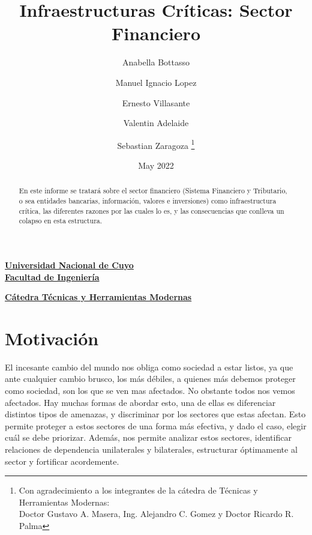 \documentclass{article}
\title{Infraestructuras Críticas: Sector Financiero}
\author{Anabella Bottasso \and Manuel Ignacio Lopez \and
Ernesto Villasante \and Valentin Adelaide \and Sebastian Zaragoza \thanks{ Con agradecimiento a los integrantes de la cátedra de Técnicas y Herramientas Modernas: \\ Doctor Gustavo A. Masera, Ing. Alejandro C. Gomez y Doctor Ricardo R. Palma }
}
\date{May 2022}
\begin{document}
\maketitle


\Centering
\textbf{
\href{https://www.uncuyo.edu.ar/}{Universidad Nacional de Cuyo} 
 }
\\

\textbf{
\href{https://ingenieria.uncuyo.edu.ar/}{Facultad de Ingeniería}  
}


\textbf{
\href{https://sites.google.com/view/tyhm/inicio}{Cátedra Técnicas y Herramientas Modernas} 
\\}
\newpage
\justify
\tableofcontents
\newpage
\begin{abstract}

    En este informe se tratará sobre el sector financiero (Sistema Financiero y Tributario, o sea entidades bancarias, información, valores e inversiones) como infraestructura crítica, las diferentes razones por las cuales lo es, y las consecuencias que conlleva un colapso en esta estructura.
\end{abstract}
\section{Motivación}
El incesante cambio del mundo nos obliga como sociedad a estar listos, ya que ante cualquier cambio brusco, los más débiles, a quienes más debemos proteger como sociedad, son los que se ven mas afectados. No obstante todos nos vemos afectados. 
\newline
\newline
Hay muchas formas de abordar esto, una de ellas es diferenciar distintos tipos de amenazas, y discriminar por los sectores que estas afectan. 
\newline
\newline
Esto permite proteger a estos sectores de una forma más efectiva, y dado el caso, elegir cuál se debe priorizar.
\newline
\newline
Además, nos permite analizar estos sectores, identificar relaciones de dependencia  unilaterales y bilaterales, estructurar óptimamente al sector y fortificar acordemente.  
\end{document}
